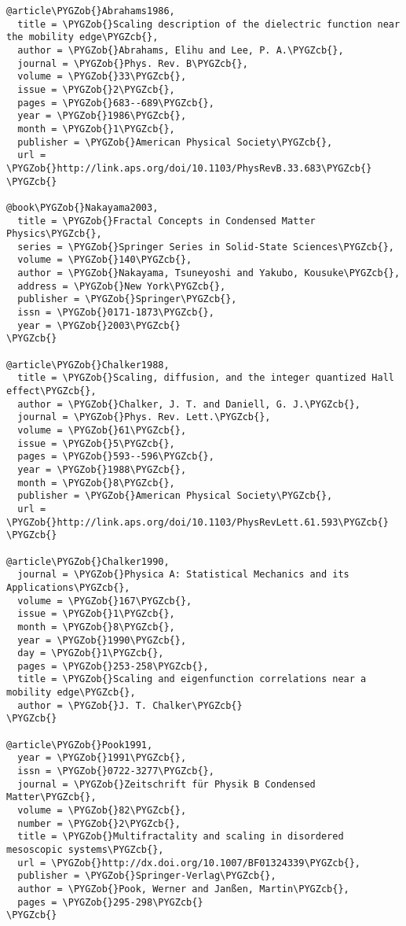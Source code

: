 \documentclass[letterpaper,10pt,english]{sphinxmanual}
\def\PYGZob{\char`\{}
\def\PYGZcb{\char`\}}
\begin{document}
\begin{Verbatim}[commandchars=\\\{\}]
@article\PYGZob{}Abrahams1986,
  title = \PYGZob{}Scaling description of the dielectric function near the mobility edge\PYGZcb{},
  author = \PYGZob{}Abrahams, Elihu and Lee, P. A.\PYGZcb{},
  journal = \PYGZob{}Phys. Rev. B\PYGZcb{},
  volume = \PYGZob{}33\PYGZcb{},
  issue = \PYGZob{}2\PYGZcb{},
  pages = \PYGZob{}683--689\PYGZcb{},
  year = \PYGZob{}1986\PYGZcb{},
  month = \PYGZob{}1\PYGZcb{},
  publisher = \PYGZob{}American Physical Society\PYGZcb{},
  url = \PYGZob{}http://link.aps.org/doi/10.1103/PhysRevB.33.683\PYGZcb{}
\PYGZcb{}

@book\PYGZob{}Nakayama2003,
  title = \PYGZob{}Fractal Concepts in Condensed Matter Physics\PYGZcb{},
  series = \PYGZob{}Springer Series in Solid-State Sciences\PYGZcb{},
  volume = \PYGZob{}140\PYGZcb{},
  author = \PYGZob{}Nakayama, Tsuneyoshi and Yakubo, Kousuke\PYGZcb{},
  address = \PYGZob{}New York\PYGZcb{},
  publisher = \PYGZob{}Springer\PYGZcb{},
  issn = \PYGZob{}0171-1873\PYGZcb{},
  year = \PYGZob{}2003\PYGZcb{}
\PYGZcb{}

@article\PYGZob{}Chalker1988,
  title = \PYGZob{}Scaling, diffusion, and the integer quantized Hall effect\PYGZcb{},
  author = \PYGZob{}Chalker, J. T. and Daniell, G. J.\PYGZcb{},
  journal = \PYGZob{}Phys. Rev. Lett.\PYGZcb{},
  volume = \PYGZob{}61\PYGZcb{},
  issue = \PYGZob{}5\PYGZcb{},
  pages = \PYGZob{}593--596\PYGZcb{},
  year = \PYGZob{}1988\PYGZcb{},
  month = \PYGZob{}8\PYGZcb{},
  publisher = \PYGZob{}American Physical Society\PYGZcb{},
  url = \PYGZob{}http://link.aps.org/doi/10.1103/PhysRevLett.61.593\PYGZcb{}
\PYGZcb{}

@article\PYGZob{}Chalker1990,
  journal = \PYGZob{}Physica A: Statistical Mechanics and its Applications\PYGZcb{},
  volume = \PYGZob{}167\PYGZcb{}, 
  issue = \PYGZob{}1\PYGZcb{},
  month = \PYGZob{}8\PYGZcb{},
  year = \PYGZob{}1990\PYGZcb{},
  day = \PYGZob{}1\PYGZcb{},
  pages = \PYGZob{}253-258\PYGZcb{},
  title = \PYGZob{}Scaling and eigenfunction correlations near a mobility edge\PYGZcb{},
  author = \PYGZob{}J. T. Chalker\PYGZcb{}
\PYGZcb{}

@article\PYGZob{}Pook1991,
  year = \PYGZob{}1991\PYGZcb{},
  issn = \PYGZob{}0722-3277\PYGZcb{},
  journal = \PYGZob{}Zeitschrift für Physik B Condensed Matter\PYGZcb{},
  volume = \PYGZob{}82\PYGZcb{},
  number = \PYGZob{}2\PYGZcb{},
  title = \PYGZob{}Multifractality and scaling in disordered mesoscopic systems\PYGZcb{},
  url = \PYGZob{}http://dx.doi.org/10.1007/BF01324339\PYGZcb{},
  publisher = \PYGZob{}Springer-Verlag\PYGZcb{},
  author = \PYGZob{}Pook, Werner and Janßen, Martin\PYGZcb{},
  pages = \PYGZob{}295-298\PYGZcb{}
\PYGZcb{}
\end{Verbatim}
\end{document}
